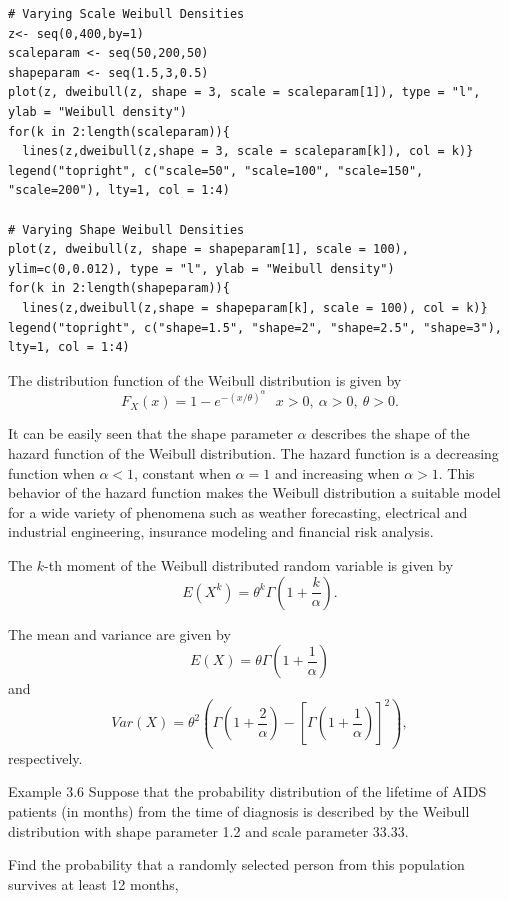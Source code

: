 \documentclass[]{book}
\theoremstyle{definition}
\theoremstyle{definition}
\theoremstyle{definition}
\theoremstyle{remark}
\begin{document}
\hypertarget{display.ux20Weibullscale.2}{}
\begin{verbatim}
# Varying Scale Weibull Densities
z<- seq(0,400,by=1)
scaleparam <- seq(50,200,50)
shapeparam <- seq(1.5,3,0.5)
plot(z, dweibull(z, shape = 3, scale = scaleparam[1]), type = "l", ylab = "Weibull density")
for(k in 2:length(scaleparam)){
  lines(z,dweibull(z,shape = 3, scale = scaleparam[k]), col = k)}
legend("topright", c("scale=50", "scale=100", "scale=150", "scale=200"), lty=1, col = 1:4)

# Varying Shape Weibull Densities
plot(z, dweibull(z, shape = shapeparam[1], scale = 100), ylim=c(0,0.012), type = "l", ylab = "Weibull density")
for(k in 2:length(shapeparam)){
  lines(z,dweibull(z,shape = shapeparam[k], scale = 100), col = k)}
legend("topright", c("shape=1.5", "shape=2", "shape=2.5", "shape=3"), lty=1, col = 1:4)
\end{verbatim}

The distribution function of the Weibull distribution is given by
\[F_{X}\left( x \right) = 1 - e^{- \left( x / \theta \right)^{\alpha}}  \ \ \ x >  0,\ \alpha >  0,\ \theta > 0.\]

It can be easily seen that the shape parameter \(\alpha\) describes the
shape of the hazard function of the Weibull distribution. The hazard
function is a decreasing function when \(\alpha < 1\), constant when
\(\alpha = 1\) and increasing when \(\alpha > 1\). This behavior of the
hazard function makes the Weibull distribution a suitable model for a
wide variety of phenomena such as weather forecasting, electrical and
industrial engineering, insurance modeling and financial risk analysis.

The \(k\)-th moment of the Weibull distributed random variable is given
by
\[E\left( X^{k} \right) = \theta^{k}\Gamma\left( 1 + \frac{k}{\alpha} \right) .\]

The mean and variance are given by
\[E\left( X \right) = \theta\Gamma\left( 1 + \frac{1}{\alpha} \right)\]
and
\[Var(X)= \theta^{2}\left( \Gamma\left( 1 + \frac{2}{\alpha} \right)  - \left\lbrack \Gamma\left( 1 + \frac{1}{\alpha} \right) \right\rbrack  ^{2}\right),\]
respectively.

Example 3.6 Suppose that the probability distribution of the lifetime of
AIDS patients (in months) from the time of diagnosis is described by the
Weibull distribution with shape parameter 1.2 and scale parameter 33.33.

Find the probability that a randomly selected person from this
population survives at least 12 months,
\end{document}
